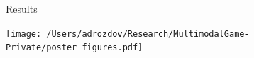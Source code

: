 \documentclass[final]{beamer}
\newlength{\sepwid}
\newlength{\onecolwid}
\newlength{\twocolwid}
\begin{document}
\begin{frame}[t]
\begin{columns}[t]
\begin{column}{\onecolwid}
\end{column} %


\begin{column}{\sepwid}\end{column} %

\begin{column}{\twocolwid} %

\begin{block}{Results}

\begin{minipage}{\textwidth}
\centering
\texttt{[image: /Users/adrozdov/Research/MultimodalGame-Private/poster\_figures.pdf]}
\end{minipage}







\end{block}
\end{column}
\end{columns}
\end{frame}
\end{document}
